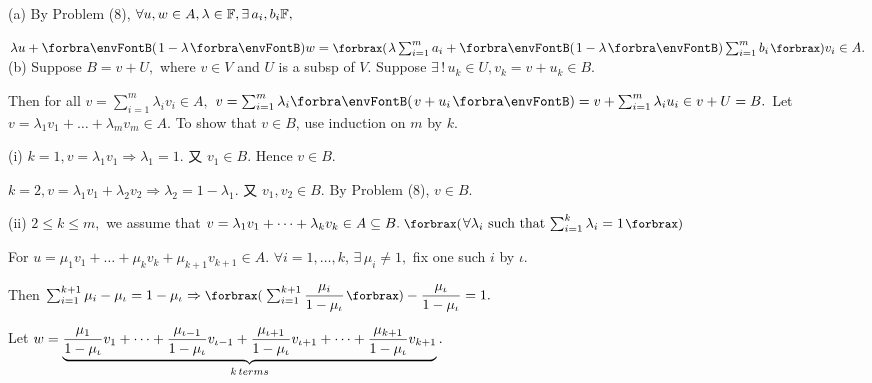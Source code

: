\par\quad
(a) By Problem (8), $\forall u, w\in A,\lambda\in{\mathbb{F}},\exists\,a_i,b_i{\mathbb{F}},$\par\quad\Ha
$\lambda u+\Par{1-\lambda}w=\XPar{\lambda\sum_{i=1}^m a_i+\Par{1-\lambda}\sum_{i=1}^m b_i}v_i\in A.$\PfEnd\vspace{8pt}\quad
(b) Suppose $B=v+U,$ where $v\in V$ and $U$ is a subsp of $V.$ Suppose $\exists\,!\,u_k\in U,v_k=v+u_k\in B.$\par\quad\Hb
Then for all $v=\sum_{i=1}^m \lambda_i v_i\in A,$ $v=\sum_{i=1}^m \lambda_i\Par{v+u_i}=v+\sum_{i=1}^m \lambda_i u_i\in v+U=B.$\PfEnd\vspace{10pt}\quad\Hb 
\Or \vspace{2pt}Let $v=\lambda_1 v_1+\dots+\lambda_m v_m\in A$. To show that $v\in B$, use induction on $m$ by $k$.\par\quad\Hb
(i) \vspace{2pt}$k=1,v=\lambda_1 v_1\Rightarrow \lambda_1=1.$ 又 $v_1\in B.$ Hence $v\in B$.\par\quad\Hb\Hi
\vspace{6pt}$k=2,v=\lambda_1 v_1+\lambda_2 v_2\Rightarrow\lambda_2=1-\lambda_1.$ 又 $v_1,v_2\in B.$ By Problem (8), $v\in B$.\par\quad\Hb\Endi
(ii) \vspace{6pt}$2\leqslant k\leqslant m,$ we assume that $v=\lambda_1 v_1+\dots+\lambda_k v_k\in A\subseteq B.\;\XPar{\forall\lambda_i$ such that $\sum_{i=1}^k\lambda_i=1}$\par\quad\Hb\Hii
\vspace{6pt}For $u=\mu_1 v_1+\dots+\mu_k v_k+\mu_{k+1} v_{k+1}\in A.\,\,\forall i=1,\dots,k,\,\exists\,\mu_i\neq 1,$ fix one such $i$ by $\iota$.\par\quad\Hb\Hii
\vspace{6pt}Then $\sum_{i=1}^{k+1}\mu_i-\mu_\iota=1-\mu_\iota\Rightarrow\XPar{\sum_{i=1}^{k+1}\Frac{\mu_i}{1-\mu_\iota}}-\Frac{\mu_\iota}{1-\mu_\iota}=1.$\par\quad\Hb\Hii
\vspace{6pt}Let $w=\underbrace{{\displaystyle{\frac{\mu_1}{1-\mu_\iota}}}v_1+\dots+{\displaystyle{\frac{\mu_{\iota-1}}{1-\mu_\iota}}}v_{\iota-1}+{\displaystyle{\frac{\mu_{\iota+1}}{1-\mu_\iota}}}v_{\iota+1}+\dots+{\displaystyle{\frac{\mu_{k+1}}{1-\mu_\iota}}}v_{k+1}}_{k\,terms}.$\par\quad\Hb\Hii
